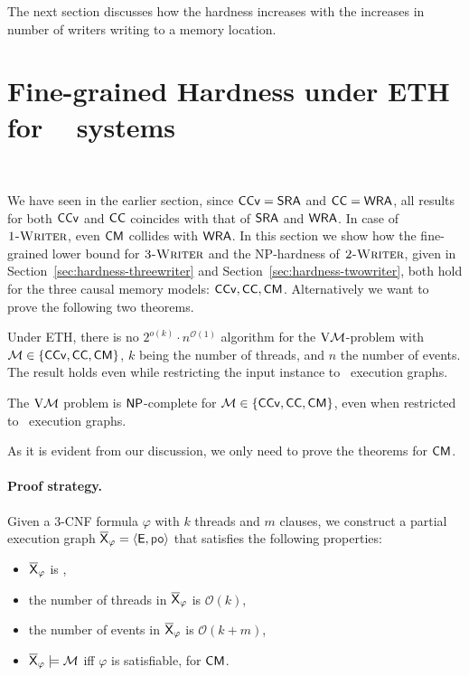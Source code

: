The next section discusses how the hardness increases with the increases in number of writers writing to a memory location.

\section{Fine-grained Hardness under ETH for \threewriter~ systems}~\label{app:cc-3w}

We have seen in the earlier section, since $\mathsf{CCv} = \mathsf{SRA}$ and $\mathsf{CC}=\mathsf{WRA}$, all results  for both $\mathsf{CCv}$ and $\mathsf{CC}$ coincides with that of $\mathsf{SRA}$ and $\mathsf{WRA}$. In case of $\textsc{1-Writer}$, even $\mathsf{CM}$ collides with $\mathsf{WRA}$. In this section we show how the fine-grained lower bound for $\textsc{3-Writer}$ and the NP-hardness of $\textsc{2-Writer}$, given in Section~\ref{sec:hardness-threewriter} and Section~\ref{sec:hardness-twowriter}, both hold for the three causal memory models: $\mathsf{CCv},\mathsf{CC},\mathsf{CM}$. Alternatively we want to prove the following two theorems.

\begin{theorem}\label{thm:cm-eth-hardness}
    Under ETH, there is no $2^{o(k)} \cdot n^{\mathcal{O}(1)}$ algorithm for the $\mathrm{V}\mathcal{M}$-problem with $\mathcal{M} \in \{ \mathsf{CCv}, \mathsf{CC}, \mathsf{CM}\}$, $k$ being the number of threads, and $n$ the number of events. The result holds even while restricting the input instance to \threewriter\ execution graphs.
\end{theorem}

\begin{theorem}
\label{thm:cm-two-writer-hardness}
    The $\mathrm{V}\mathcal{M}$ problem is $\mathsf{NP}$-complete for $\mathcal{M} \in \{\mathsf{CCv}, \mathsf{CC}, \mathsf{CM}\}$, even when restricted to \twowriter\ execution graphs.
\end{theorem}

As it is evident from our discussion, we only need to prove the theorems for $\mathsf{CM}$.

\paragraph*{Proof strategy.} Given a 3-CNF formula $\varphi$ with $k$ threads and $m$ clauses, we construct a partial execution graph $\expartial_\varphi = \tuple{\E, \po}$ that satisfies the following properties:
\begin{itemize}
\item $\overline{\mathsf{\color{black}X}}_\varphi$ is \threewriter,
\item the number of threads in $\overline{\mathsf{\color{black}X}}_\varphi$ is $\mathcal{O}(k)$,
\item the number of events in $\overline{\mathsf{\color{black}X}}_\varphi$ is $\mathcal{O}(k + m)$, 
\item $\overline{\mathsf{\color{black}X}}_\varphi \models \mathcal{M}$ iff $\varphi$ is satisfiable, for $\mathsf{CM}$. 
\end{itemize} 


